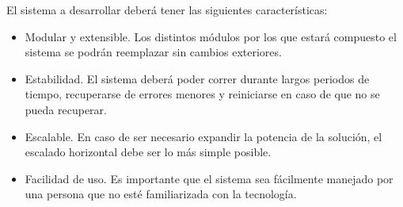 El sistema a desarrollar deberá tener las siguientes características:

\begin{itemize}
    \item Modular y extensible. Los distintos módulos por los que estará compuesto el sistema se podrán reemplazar sin cambios exteriores.
    \item Estabilidad. El sistema deberá poder correr durante largos periodos de tiempo, recuperarse de errores menores y reiniciarse en caso de que no se pueda recuperar.
    \item Escalable. En caso de ser necesario expandir la potencia de la solución, el escalado horizontal debe ser lo más simple posible.
    \item Facilidad de uso. Es importante que el sistema sea fácilmente manejado por una persona que no esté familiarizada con la tecnología.
\end{itemize}
